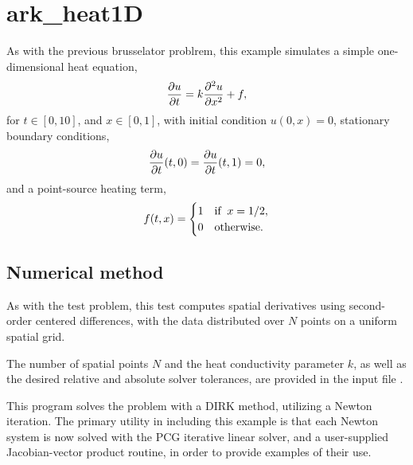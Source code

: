 \documentclass[letterpaper,10pt,english]{sphinxmanual}
\begin{document}
\chapter{ark\_heat1D}
\label{ark_heat1D:ark-heat1d}\label{ark_heat1D::doc}\label{ark_heat1D:id1}
As with the previous brusselator problrem, this example simulates a
simple one-dimensional heat equation,
\begin{gather}
\begin{split}\frac{\partial u}{\partial t} = k \frac{\partial^2 u}{\partial x^2} + f,\end{split}\notag
\end{gather}
for $t \in [0, 10]$, and $x \in [0, 1]$, with initial
condition $u(0,x) = 0$, stationary boundary conditions,
\begin{gather}
\begin{split}\frac{\partial u}{\partial t}(t,0) = \frac{\partial u}{\partial t}(t,1) = 0,\end{split}\notag
\end{gather}
and a point-source heating term,
\begin{gather}
\begin{split}f(t,x) = \begin{cases} 1 & \text{if}\;\; x=1/2, \\
                       0 & \text{otherwise}. \end{cases}\end{split}\notag
\end{gather}

\section{Numerical method}
\label{ark_heat1D:numerical-method}
As with the  test problem, this test computes
spatial derivatives using second-order centered differences, with the
data distributed over $N$ points on a uniform spatial grid.

The number of spatial points $N$ and the heat conductivity
parameter $k$, as well as the desired relative and absolute
solver tolerances, are provided in the input file .

This program solves the problem with a DIRK method, utilizing a Newton
iteration.  The primary utility in including this example is that each
Newton system is now solved with the PCG iterative linear solver, and
a user-supplied Jacobian-vector product routine, in order to provide
examples of their use.
\end{document}
